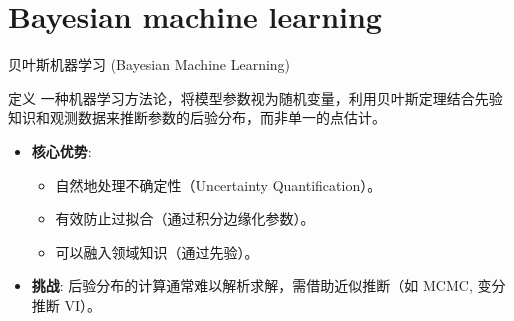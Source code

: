 \documentclass[12pt, t, aspectratio=169]{beamer}
\begin{document}
\section{Bayesian machine learning}
\begin{frame}{贝叶斯机器学习 (Bayesian Machine Learning)}
    \begin{block}{定义}
        一种机器学习方法论，将模型参数视为随机变量，利用贝叶斯定理结合先验知识和观测数据来推断参数的后验分布，而非单一的点估计。
    \end{block}
    
    \vspace{0.2cm}
    \begin{itemize}
        \item \textbf{核心优势}:
        \begin{itemize}
            \item 自然地处理不确定性（Uncertainty Quantification）。
            \item 有效防止过拟合（通过积分边缘化参数）。
            \item 可以融入领域知识（通过先验）。
        \end{itemize}
        \item \textbf{挑战}: 后验分布的计算通常难以解析求解，需借助近似推断（如 MCMC, 变分推断 VI）。
    \end{itemize}
\end{frame}
\end{document}
